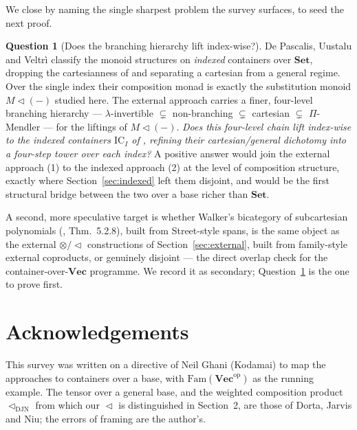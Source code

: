 \documentclass[11pt]{amsart}
\theoremstyle{plain}
\theoremstyle{definition}
\newtheorem{question}[theorem]{Question}
\theoremstyle{remark}
\newcommand{\Set}{\mathbf{Set}}
\newcommand{\Vect}{\mathbf{Vec}}
\newcommand{\Fam}{\mathrm{Fam}}
\renewcommand{\lhd}{\vartriangleleft}
\newcommand{\op}{\mathrm{op}}
\begin{document}
We close by naming the single sharpest problem the survey surfaces, to seed the next proof.

\begin{question}[Does the branching hierarchy lift index-wise?]\label{q:main}
De Pascalis, Uustalu and Veltr\`i \cite{DPUV} classify the monoid structures on \emph{indexed}
containers over $\Set$, dropping the cartesianness of \cite{GambinoKock} and separating a cartesian
from a general regime. Over the single index their composition monad is exactly the substitution
monoid $M\lhd(-)$ studied here. The external approach carries a finer, four-level branching hierarchy
--- $\lambda$-invertible $\subsetneq$ non-branching $\subsetneq$ cartesian $\subsetneq$
$\Pi$-Mendler --- for the liftings of $M\lhd(-)$. \emph{Does this four-level chain lift index-wise to
the indexed containers $\mathrm{IC}_I$ of \cite{DPUV}, refining their cartesian/general dichotomy into
a four-step tower over each index?} A positive answer would join the external approach (1) to the
indexed approach (2) at the level of composition structure, exactly where Section~\ref{sec:indexed}
left them disjoint, and would be the first structural bridge between the two over a base richer than
$\Set$.
\end{question}

A second, more speculative target is whether Walker's bicategory of subcartesian polynomials
(\cite{Walker}, Thm.~5.2.8), built from Street-style spans, is the same object as the external
$\otimes/\lhd$ constructions of Section~\ref{sec:external}, built from family-style external
coproducts, or genuinely disjoint --- the direct overlap check for the container-over-$\Vect$
programme. We record it as secondary; Question~\ref{q:main} is the one to prove first.

\section*{Acknowledgements}
This survey was written on a directive of Neil Ghani (Kodamai) to map the approaches to containers
over a base, with $\Fam(\Vect^\op)$ as the running example. The tensor over a general base, and the
weighted composition product $\lhd_{\mathrm{DJN}}$ from which our $\lhd$ is distinguished in
Section~2, are those of Dorta, Jarvis and Niu; the errors of framing are the author's.
\end{document}
